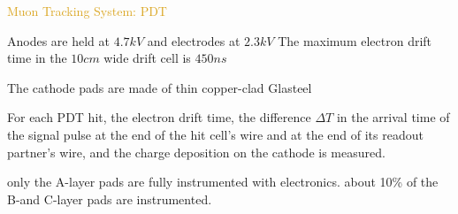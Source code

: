 \begin{frame}{\textcolor{Goldenrod}{Muon Tracking System: PDT}}
  \begin{overlayarea}{\textwidth}{\textheight}
    \itt

  \item Anodes are held at $4.7 kV$ and electrodes at $2.3 kV$
    The maximum electron drift time in the $10 cm$ wide drift cell is
    $450 ns$
    
  \item The cathode pads are made of
    thin copper-clad Glasteel
    
  \item For each PDT hit, the
    electron drift time, the difference $\Delta T$ in the arrival time of the
    signal pulse at the end of the hit cell’s wire and at the end of
    its readout partner’s wire, and the charge deposition on the
    cathode is measured.

  \item
    only the A-layer pads are fully instrumented with electronics.
    about 10\% of the B-and C-layer pads are instrumented.
  \tti
  \end{overlayarea}
\end{frame}

